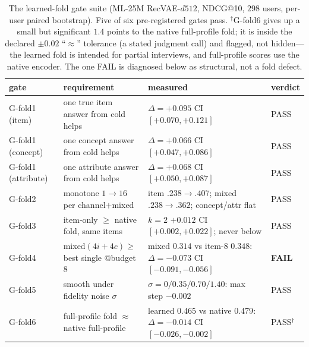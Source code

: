 \documentclass[11pt]{article}
\begin{document}
\begin{table}[h]\centering\small
\begin{tabular}{llll}
\toprule
gate & requirement & measured & verdict\\
\midrule
G-fold1 (item) & one true item answer from cold helps & $\Delta{=}{+}0.095$ CI$[{+}0.070,{+}0.121]$ & PASS\\
G-fold1 (concept) & one concept answer from cold helps & $\Delta{=}{+}0.066$ CI$[{+}0.047,{+}0.086]$ & PASS\\
G-fold1 (attribute) & one attribute answer from cold helps & $\Delta{=}{+}0.068$ CI$[{+}0.050,{+}0.087]$ & PASS\\
G-fold2 & monotone $1{\to}16$ per channel$+$mixed & item $.238{\to}.407$; mixed $.238{\to}.362$; concept/attr flat & PASS\\
G-fold3 & item-only $\ge$ native fold, same items & $k{=}2$ ${+}0.012$ CI$[{+}0.002,{+}0.022]$; never below & PASS\\
G-fold4 & mixed$(4i{+}4c)\ge$ best single @budget 8 & mixed $0.314$ vs item-8 $0.348$: $\Delta{=}{-}0.073$ CI$[{-}0.091,{-}0.056]$ & \textbf{FAIL}\\
G-fold5 & smooth under fidelity noise $\sigma$ & $\sigma{=}0/0.35/0.70/1.40$: max step $-0.002$ & PASS\\
G-fold6 & full-profile fold $\approx$ native full-profile & learned $0.465$ vs native $0.479$: $\Delta{=}{-}0.014$ CI$[{-}0.026,{-}0.002]$ & PASS$^\dagger$\\
\bottomrule
\end{tabular}
\caption{The learned-fold gate suite (ML-25M RecVAE-$d512$, NDCG@10, $298$ users, per-user paired bootstrap).
Five of six pre-registered gates pass. $^\dagger$G-fold6 gives up a small but significant $1.4$ points to the
native full-profile fold; it is inside the declared $\pm0.02$ ``$\approx$'' tolerance (a stated judgment call)
and flagged, not hidden---the learned fold is intended for partial interviews, and full-profile scores use
the native encoder. The one FAIL is diagnosed below as structural, not a fold defect.}
\label{tab:i2fold}
\end{table}
\end{document}
